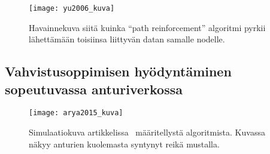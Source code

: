 \begin{figure}[h]
  \centering
  \texttt{[image: yu2006\_kuva]}
  \caption{Havainnekuva siitä kuinka ``path reinforcement'' algoritmi pyrkii
    lähettämään toisiinsa liittyvän datan samalle nodelle.~\parencite{Yu2006}}
\label{fig:yu2006}
\end{figure}

\subsection{Vahvistusoppimisen hyödyntäminen sopeutuvassa anturiverkossa}

\begin{figure}[h]
  \centering
  \texttt{[image: arya2015\_kuva]}
  \caption{Simulaatiokuva artikkelissa~\cite{Arya2015} määritellystä
algoritmista. Kuvassa näkyy anturien kuolemasta syntynyt reikä mustalla.}
\label{fig:arya2015}
\end{figure}

